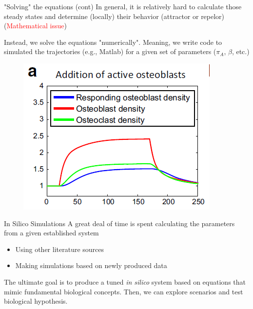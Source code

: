 \documentclass{beamer}
\begin{document}
\begin{frame}{"Solving" the equations (cont)}
	In general, it is relatively hard to calculate those steady states and determine (locally) their behavior (attractor  or repelor) (\textcolor{red}{Mathematical issue})
	
	Instead, we solve the equations "numerically". Meaning, we write code to simulated the trajectories (e.g., Matlab) for a given set of parameters ($\pi_A$, $\beta$, etc.)
\begin{figure}[h]
	\centering
		\includegraphics[scale=0.45]{../Figures/fig_numeric_sol.png}
	
\end{figure}		 
	
	
\end{frame}

\begin{frame}{In Silico Simulations}
A great deal of time is spent calculating the parameters from a given established system
\begin{itemize}
	\item Using other literature sources
	\item Making simulations based on newly produced data	
\end{itemize}

The ultimate goal is to produce a tuned \textit{in silico} system based on  equations that mimic fundamental biological concepts. Then, we can explore scenarios and test biological hypothesis. 



\end{frame}
\end{document}
